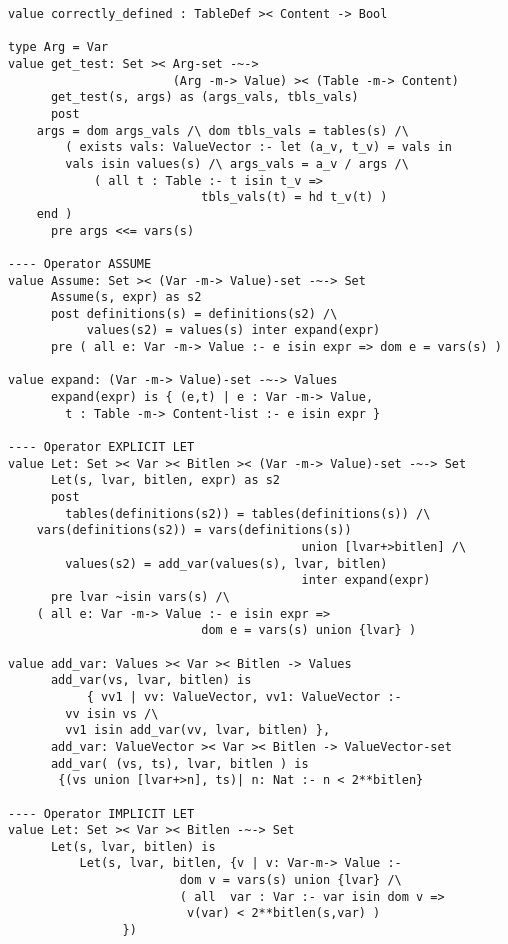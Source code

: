 \begin{lstlisting}
value correctly_defined : TableDef >< Content -> Bool

type Arg = Var
value get_test: Set >< Arg-set -~->
                       (Arg -m-> Value) >< (Table -m-> Content)
      get_test(s, args) as (args_vals, tbls_vals)
      post
	args = dom args_vals /\ dom tbls_vals = tables(s) /\
        ( exists vals: ValueVector :- let (a_v, t_v) = vals in
	    vals isin values(s) /\ args_vals = a_v / args /\
            ( all t : Table :- t isin t_v =>
                           tbls_vals(t) = hd t_v(t) )
	end )
      pre args <<= vars(s)

---- Operator ASSUME
value Assume: Set >< (Var -m-> Value)-set -~-> Set
      Assume(s, expr) as s2
      post definitions(s) = definitions(s2) /\
           values(s2) = values(s) inter expand(expr)
      pre ( all e: Var -m-> Value :- e isin expr => dom e = vars(s) )

value expand: (Var -m-> Value)-set -~-> Values
      expand(expr) is { (e,t) |	e : Var -m-> Value,
		t : Table -m-> Content-list :- e isin expr }

---- Operator EXPLICIT LET
value Let: Set >< Var >< Bitlen >< (Var -m-> Value)-set -~-> Set
      Let(s, lvar, bitlen, expr) as s2
      post
        tables(definitions(s2)) = tables(definitions(s)) /\
	vars(definitions(s2)) = vars(definitions(s))
                                         union [lvar+>bitlen] /\
        values(s2) = add_var(values(s), lvar, bitlen)
                                         inter expand(expr)
      pre lvar ~isin vars(s) /\
	( all e: Var -m-> Value :- e isin expr =>
                           dom e = vars(s) union {lvar} )

value add_var: Values >< Var >< Bitlen -> Values
      add_var(vs, lvar, bitlen) is
           { vv1 | vv: ValueVector, vv1: ValueVector :-
		vv isin vs /\
		vv1 isin add_var(vv, lvar, bitlen) },
      add_var: ValueVector >< Var >< Bitlen -> ValueVector-set
      add_var( (vs, ts), lvar, bitlen ) is
	   {(vs union [lvar+>n], ts)| n: Nat :- n < 2**bitlen}

---- Operator IMPLICIT LET
value Let: Set >< Var >< Bitlen -~-> Set
      Let(s, lvar, bitlen) is
          Let(s, lvar, bitlen, {v | v: Var-m-> Value :-
                        dom v = vars(s) union {lvar} /\
                        ( all  var : Var :- var isin dom v =>
                         v(var) < 2**bitlen(s,var) )
				})



\end{lstlisting}
